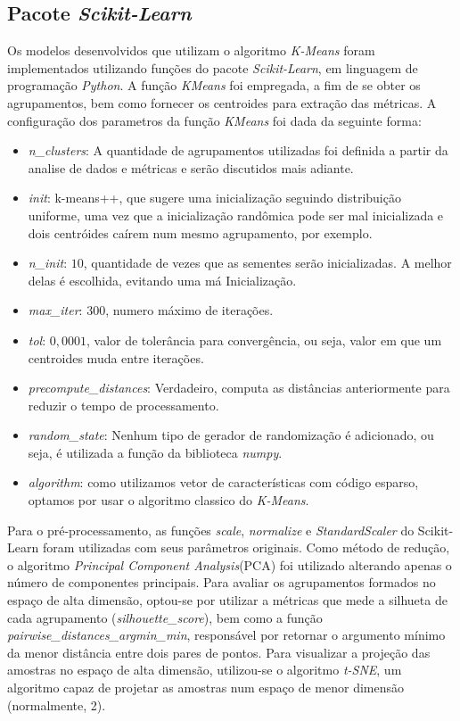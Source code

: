 \documentclass[conference]{IEEEtran}
\begin{document}
\subsection{Pacote \textit{Scikit-Learn}} \label{sec:pac}

Os modelos desenvolvidos que utilizam o algoritmo \emph{K-Means} foram implementados utilizando funções do pacote \emph{Scikit-Learn}, em linguagem de programação \emph{Python}. A função \emph{KMeans} foi empregada, a fim de se obter os agrupamentos, bem como fornecer os centroides para extração das métricas. A configuração dos parametros da função \emph{KMeans} foi dada da seguinte forma:
\begin{itemize}
	\footnotesize \item \textit{n\_clusters}: A quantidade de agrupamentos utilizadas foi definida a partir da analise de dados e métricas e serão discutidos mais adiante.
	\footnotesize \item \textit{init}: k-means++, que sugere uma inicialização seguindo distribuição uniforme, uma vez que a inicialização randômica pode ser mal inicializada e dois centróides caírem num mesmo agrupamento, por exemplo.
	\footnotesize \item \textit{n\_init}: $10$, quantidade de vezes que as sementes serão inicializadas. A melhor delas é escolhida, evitando uma má Inicialização.
	\footnotesize \item \textit{max\_iter}: $300$, numero máximo de iterações.
	\footnotesize \item \textit{tol}: $0,0001$, valor de tolerância para convergência, ou seja, valor em que um centroides muda entre iterações.
	\footnotesize \item \textit{precompute\_distances}: Verdadeiro, computa as distâncias anteriormente para reduzir o tempo de processamento.
	\footnotesize \item \textit{random\_state}: Nenhum tipo de gerador de randomização é adicionado, ou seja, é utilizada a função da biblioteca \emph{numpy}.
	\footnotesize \item \textit{algorithm}: como utilizamos vetor de características com código esparso, optamos por usar o algoritmo classico do \emph{K-Means}.
\end{itemize}

Para o pré-processamento, as funções \emph{scale}, \emph{normalize} e \emph{StandardScaler} do Scikit-Learn foram utilizadas com seus parâmetros originais. Como método de redução, o algoritmo \emph{Principal Component Analysis}(PCA) foi utilizado alterando apenas o número de componentes principais. Para avaliar os agrupamentos formados no espaço de alta dimensão, optou-se por utilizar a métricas que mede a silhueta de cada agrupamento (\emph{silhouette\_score}), bem como a função \emph{pairwise\_distances\_argmin\_min}, responsável por retornar o argumento mínimo da menor distância entre dois pares de pontos. Para visualizar a projeção das amostras no espaço de alta dimensão, utilizou-se o algoritmo \emph{t-SNE}, um algoritmo capaz de projetar as amostras num espaço de menor dimensão (normalmente, 2).
\end{document}
